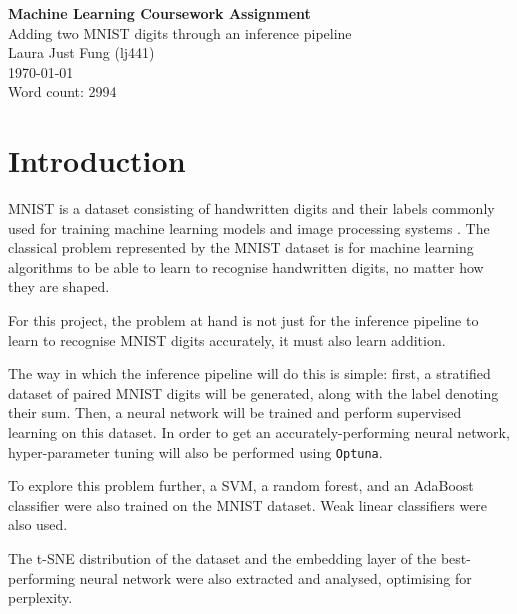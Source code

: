 \documentclass[11pt,a4paper]{article}
\begin{document}
 

\begin{center}
    \LARGE{\textbf{Machine Learning Coursework Assignment}}
    \\
    \Large{{Adding two MNIST digits through an inference pipeline}}
    \\
    \large{Laura Just Fung (lj441)}
    \\
    \today
    \\
    Word count: 2994
\end{center}

\section{Introduction}

MNIST is a dataset consisting of handwritten digits and their labels commonly used for training machine learning models and image processing systems \citep{deng2012mnist}. The classical problem represented by the MNIST dataset is for machine learning algorithms to be able to learn to recognise handwritten digits, no matter how they are shaped.

For this project, the problem at hand is not just for the inference pipeline to learn to recognise MNIST digits accurately, it must also learn addition.


The way in which the inference pipeline will do this is simple: first, a stratified dataset of paired MNIST digits will be generated, along with the label denoting their sum. Then, a neural network will be trained and perform supervised learning on this dataset. In order to get an accurately-performing neural network, hyper-parameter tuning will also be performed using \texttt{Optuna}.

To explore this problem further, a SVM, a random forest, and an AdaBoost classifier were also trained on the MNIST dataset. Weak linear classifiers were also used.

The t-SNE distribution of the dataset and the embedding layer of the best-performing neural network were also extracted and analysed, optimising for perplexity.
\end{document}
